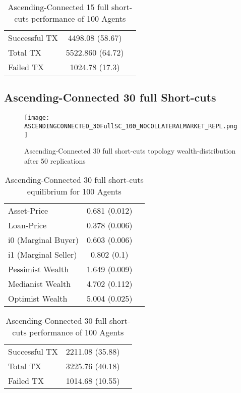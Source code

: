\documentclass[Bachelorarbeit.tex]{subfiles}
\begin{document}
\begin{table}[!htbp]
	\caption{Ascending-Connected 15 full short-cuts performance of 100 Agents}
	\centering
	\begin{tabular} { l c r }
		\hline
		Successful TX & 4498.08 (58.67) \\
		Total TX & 5522.860 (64.72) \\
		Failed TX & 1024.78 (17.3) \\
		\hline
	\end{tabular}
\end{table}

\subsection{Ascending-Connected 30 full Short-cuts }
\begin{figure}[!htbp]
	\centering
  \texttt{[image: ASCENDINGCONNECTED\_30FullSC\_100\_NOCOLLATERALMARKET\_REPL.png]}
	\caption{Ascending-Connected 30 full short-cuts topology wealth-distribution after 50 replications}
	\label{fig1}
\end{figure}

\begin{table}[!htbp]
	\caption{Ascending-Connected 30 full short-cuts equilibrium for 100 Agents}
	\centering
	\begin{tabular} { l c r }
		\hline
		Asset-Price & 0.681 (0.012) \\
		Loan-Price & 0.378 (0.006) \\
		i0 (Marginal Buyer) & 0.603 (0.006) \\
		i1 (Marginal Seller) & 0.802 (0.1) \\
		Pessimist Wealth & 1.649 (0.009) \\
		Medianist Wealth & 4.702 (0.112) \\
		Optimist Wealth & 5.004 (0.025) \\
		\hline
	\end{tabular}
\end{table} 

\begin{table}[!htbp]
	\caption{Ascending-Connected 30 full short-cuts performance of 100 Agents}
	\centering
	\begin{tabular} { l c r }
		\hline
		Successful TX & 2211.08 (35.88) \\
		Total TX & 3225.76 (40.18) \\
		Failed TX & 1014.68 (10.55) \\
		\hline
	\end{tabular}
\end{table}
\end{document}
